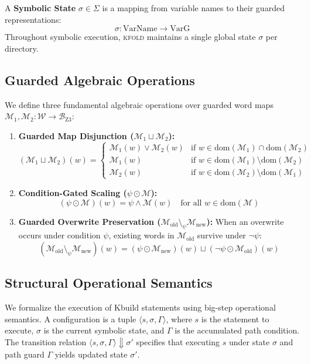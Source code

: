 \documentclass[acmsmall,screen,review]{acmart}
\newcommand{\tool}{\textsc{kfold}\xspace}
\begin{document}
A \textbf{Symbolic State} $\sigma \in \Sigma$ is a mapping from variable names to their guarded representations:
$$\sigma: \text{VarName} \to \text{VarG}$$
Throughout symbolic execution, \tool maintains a single global state $\sigma$ per directory.

\subsection{Guarded Algebraic Operations}
\label{sec:semantics:algebra}

We define three fundamental algebraic operations over guarded word maps $\mathcal{M}_1, \mathcal{M}_2: \mathcal{W} \to \mathcal{B}_{\text{Z3}}$:

\begin{enumerate}
\item \textbf{Guarded Map Disjunction ($\mathcal{M}_1 \sqcup \mathcal{M}_2$):}
$$(\mathcal{M}_1 \sqcup \mathcal{M}_2)(w) = \begin{cases}
\mathcal{M}_1(w) \vee \mathcal{M}_2(w) & \text{if } w \in \text{dom}(\mathcal{M}_1) \cap \text{dom}(\mathcal{M}_2) \\
\mathcal{M}_1(w) & \text{if } w \in \text{dom}(\mathcal{M}_1) \setminus \text{dom}(\mathcal{M}_2) \\
\mathcal{M}_2(w) & \text{if } w \in \text{dom}(\mathcal{M}_2) \setminus \text{dom}(\mathcal{M}_1)
\end{cases}$$

\item \textbf{Condition-Gated Scaling ($\psi \odot \mathcal{M}$):}
$$(\psi \odot \mathcal{M})(w) = \psi \wedge \mathcal{M}(w) \quad \text{for all } w \in \text{dom}(\mathcal{M})$$

\item \textbf{Guarded Overwrite Preservation ($\mathcal{M}_{\text{old}} \setminus_{\psi} \mathcal{M}_{\text{new}}$):}
When an overwrite occurs under condition $\psi$, existing words in $\mathcal{M}_{\text{old}}$ survive under $\neg \psi$:
$$(\mathcal{M}_{\text{old}} \setminus_{\psi} \mathcal{M}_{\text{new}})(w) = (\psi \odot \mathcal{M}_{\text{new}})(w) \sqcup (\neg\psi \odot \mathcal{M}_{\text{old}})(w)$$
\end{enumerate}

\subsection{Structural Operational Semantics}
\label{sec:semantics:sos}

We formalize the execution of Kbuild statements using big-step operational semantics. A configuration is a tuple $\langle s, \sigma, \Gamma \rangle$, where $s$ is the statement to execute, $\sigma$ is the current symbolic state, and $\Gamma$ is the accumulated path condition. The transition relation $\langle s, \sigma, \Gamma \rangle \Downarrow \sigma'$ specifies that executing $s$ under state $\sigma$ and path guard $\Gamma$ yields updated state $\sigma'$.
\end{document}
